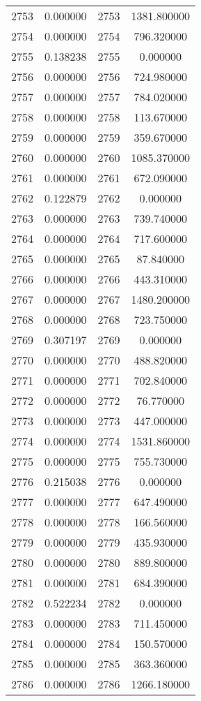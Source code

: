 \documentclass[12pt]{article}
\begin{document}
\begin{longtable}{@{}cccc@{}}
2753 & 0.000000 & 2753 & 1381.800000 \\
2754 & 0.000000 & 2754 & 796.320000 \\
2755 & 0.138238 & 2755 & 0.000000 \\
2756 & 0.000000 & 2756 & 724.980000 \\
2757 & 0.000000 & 2757 & 784.020000 \\
2758 & 0.000000 & 2758 & 113.670000 \\
2759 & 0.000000 & 2759 & 359.670000 \\
2760 & 0.000000 & 2760 & 1085.370000 \\
2761 & 0.000000 & 2761 & 672.090000 \\
2762 & 0.122879 & 2762 & 0.000000 \\
2763 & 0.000000 & 2763 & 739.740000 \\
2764 & 0.000000 & 2764 & 717.600000 \\
2765 & 0.000000 & 2765 & 87.840000 \\
2766 & 0.000000 & 2766 & 443.310000 \\
2767 & 0.000000 & 2767 & 1480.200000 \\
2768 & 0.000000 & 2768 & 723.750000 \\
2769 & 0.307197 & 2769 & 0.000000 \\
2770 & 0.000000 & 2770 & 488.820000 \\
2771 & 0.000000 & 2771 & 702.840000 \\
2772 & 0.000000 & 2772 & 76.770000 \\
2773 & 0.000000 & 2773 & 447.000000 \\
2774 & 0.000000 & 2774 & 1531.860000 \\
2775 & 0.000000 & 2775 & 755.730000 \\
2776 & 0.215038 & 2776 & 0.000000 \\
2777 & 0.000000 & 2777 & 647.490000 \\
2778 & 0.000000 & 2778 & 166.560000 \\
2779 & 0.000000 & 2779 & 435.930000 \\
2780 & 0.000000 & 2780 & 889.800000 \\
2781 & 0.000000 & 2781 & 684.390000 \\
2782 & 0.522234 & 2782 & 0.000000 \\
2783 & 0.000000 & 2783 & 711.450000 \\
2784 & 0.000000 & 2784 & 150.570000 \\
2785 & 0.000000 & 2785 & 363.360000 \\
2786 & 0.000000 & 2786 & 1266.180000 \\

\end{longtable}
\end{document}
